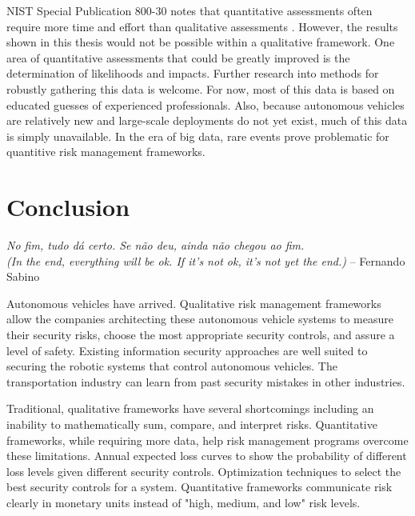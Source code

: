 \documentclass{article}
\begin{document}
NIST Special Publication 800-30 notes that quantitative assessments often require more time and effort than qualitative assessments \citep{national_institute_of_standards_and_technology_nist_2012}. However, the results shown in this thesis would not be possible within a qualitative framework. One area of quantitative assessments that could be greatly improved is the determination of likelihoods and impacts. Further research into methods for robustly gathering this data is welcome. For now, most of this data is based on educated guesses of experienced professionals. Also, because autonomous vehicles are relatively new and large-scale deployments do not yet exist, much of this data is simply unavailable. In the era of big data, rare events prove problematic for quantitive risk management frameworks.


\newpage
\section{Conclusion}

\begin{mdframed}
    \emph{No fim, tudo d\'{a} certo. Se n\~{a}o deu, ainda n\~{a}o chegou ao fim. \\ (In the end, everything will be ok. If it's not ok, it's not yet the end.)} -- Fernando Sabino
\end{mdframed}

\noindent Autonomous vehicles have arrived. Qualitative risk management frameworks allow the companies architecting these autonomous vehicle systems to measure their security risks, choose the most appropriate security controls, and assure a level of safety. Existing information security approaches are well suited to securing the robotic systems that control autonomous vehicles. The transportation industry can learn from past security mistakes in other industries.

Traditional, qualitative frameworks have several shortcomings including an inability to mathematically sum, compare, and interpret risks. Quantitative frameworks, while requiring more data, help risk management programs overcome these limitations. Annual expected loss curves to show the probability of different loss levels given different security controls. Optimization techniques to select the best security controls for a system. Quantitative frameworks communicate risk clearly in monetary units instead of "high, medium, and low" risk levels.
\end{document}
